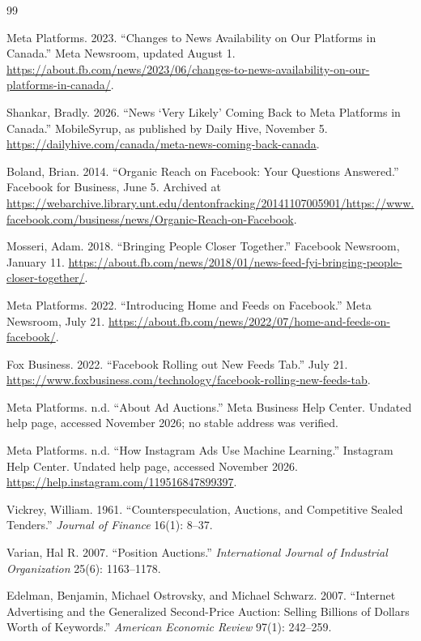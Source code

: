 \documentclass[11pt]{article}
\theoremstyle{definition}
\begin{document}
\begin{thebibliography}{99}

Meta Platforms. 2023. ``Changes to News Availability on Our Platforms in Canada.'' Meta Newsroom, updated August 1. \url{https://about.fb.com/news/2023/06/changes-to-news-availability-on-our-platforms-in-canada/}.

Shankar, Bradly. 2026. ``News `Very Likely' Coming Back to Meta Platforms in Canada.'' MobileSyrup, as published by Daily Hive, November 5. \url{https://dailyhive.com/canada/meta-news-coming-back-canada}.

Boland, Brian. 2014. ``Organic Reach on Facebook: Your Questions Answered.'' Facebook for Business, June 5. Archived at \url{https://webarchive.library.unt.edu/dentonfracking/20141107005901/https://www.facebook.com/business/news/Organic-Reach-on-Facebook}.

Mosseri, Adam. 2018. ``Bringing People Closer Together.'' Facebook Newsroom, January 11. \url{https://about.fb.com/news/2018/01/news-feed-fyi-bringing-people-closer-together/}.

Meta Platforms. 2022. ``Introducing Home and Feeds on Facebook.'' Meta Newsroom, July 21. \url{https://about.fb.com/news/2022/07/home-and-feeds-on-facebook/}.

Fox Business. 2022. ``Facebook Rolling out New Feeds Tab.'' July 21. \url{https://www.foxbusiness.com/technology/facebook-rolling-new-feeds-tab}.

Meta Platforms. n.d. ``About Ad Auctions.'' Meta Business Help Center. Undated help page, accessed November 2026; no stable address was verified.

Meta Platforms. n.d. ``How Instagram Ads Use Machine Learning.'' Instagram Help Center. Undated help page, accessed November 2026. \url{https://help.instagram.com/119516847899397}.

Vickrey, William. 1961. ``Counterspeculation, Auctions, and Competitive Sealed Tenders.'' \emph{Journal of Finance} 16(1): 8--37.

Varian, Hal R. 2007. ``Position Auctions.'' \emph{International Journal of Industrial Organization} 25(6): 1163--1178.

Edelman, Benjamin, Michael Ostrovsky, and Michael Schwarz. 2007. ``Internet Advertising and the Generalized Second-Price Auction: Selling Billions of Dollars Worth of Keywords.'' \emph{American Economic Review} 97(1): 242--259.


\end{thebibliography}
\end{document}
